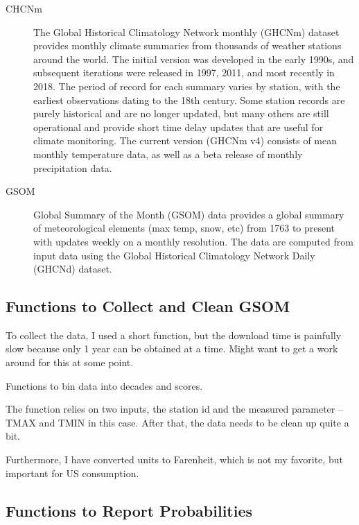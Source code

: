 \documentclass{article}
\begin{document}
\begin{itemize}
\begin{description}
  \item[CHCNm] The Global Historical Climatology Network monthly (GHCNm) dataset provides monthly climate summaries from thousands of weather stations around the world. The initial version was developed in the early 1990s, and subsequent iterations were released in 1997, 2011, and most recently in 2018. The period of record for each summary varies by station, with the earliest observations dating to the 18th century. Some station records are purely historical and are no longer updated, but many others are still operational and provide short time delay updates that are useful for climate monitoring. The current version (GHCNm v4) consists of mean monthly temperature data, as well as a beta release of monthly precipitation data.
  
  \item[GSOM] Global Summary of the Month (GSOM) data provides a global summary of meteorological elements (max temp, snow, etc) from 1763 to present with updates weekly on a monthly resolution. The data are computed from input data using the Global Historical Climatology Network Daily (GHCNd) dataset.
  
\end{description}

\subsection{Functions to Collect and Clean GSOM}

To collect the data, I used a short function, but the download time is painfully slow because only 1 year can be obtained at a time. Might want to get a work around for this at some point. 



Functions to bin data into decades and scores. 



The function relies on two inputs, the station id and the measured parameter -- TMAX and TMIN in this case. After that, the data needs to be clean up quite a bit. 

Furthermore, I have converted units to Farenheit, which is not my favorite, but important for US consumption.

\subsection{Functions to Report Probabilities}





\end{itemize}
\end{document}
